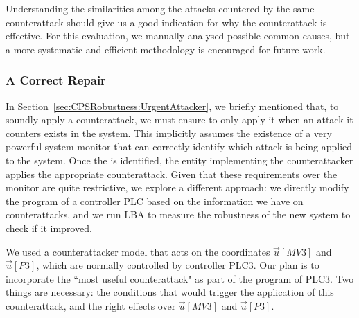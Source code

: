 {{%
Understanding the similarities among the attacks countered by the same counterattack should give us a good indication for why the counterattack is effective. For this evaluation, we manually analysed possible common causes, but a more systematic and efficient methodology is encouraged for future work. 

\subsubsection{A Correct Repair}
\label{sec:CPSRobustness:CorrectRepair}
In Section~\ref{sec:CPSRobustness:UrgentAttacker}, we briefly mentioned that, to soundly apply a counterattack, we must ensure to only apply it when an attack it counters exists in the system. This implicitly assumes the existence of a very powerful system monitor that can correctly identify which attack is being applied to the system. Once the is identified, the entity implementing the counterattacker applies the appropriate counterattack. Given that these requirements over the monitor are quite restrictive, we explore a different approach: we directly modify the program of a controller PLC based on the information we have on counterattacks, and we run LBA to measure the robustness of the new system to check if it improved. 

We used a counterattacker model that acts on the coordinates $\vec{u}[MV3]$ and $\vec{u}[P3]$, which are normally controlled by controller PLC3. Our plan is to incorporate the ``most useful counterattack" as part of the program of PLC3. Two things are necessary: the conditions that would trigger the application of this counterattack, and the right effects over $\vec{u}[MV3]$ and $\vec{u}[P3]$. 

}}
